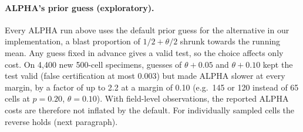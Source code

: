 \documentclass[11pt]{article}
\theoremstyle{remark}
\theoremstyle{definition}
\begin{document}
\paragraph{ALPHA's prior guess (exploratory).} Every ALPHA run above uses the default prior guess for the alternative in our implementation, a blast proportion of $1/2+\theta/2$ shrunk towards the running mean. Any guess fixed in advance gives a valid test, so the choice affects only cost. On 4,400 new 500-cell specimens, guesses of $\theta+0.05$ and $\theta+0.10$ kept the test valid (false certification at most 0.003) but made ALPHA slower at every margin, by a factor of up to 2.2 at a margin of 0.10 (e.g.\ 145 or 120 instead of 65 cells at $p=0.20$, $\theta=0.10$). With field-level observations, the reported ALPHA costs are therefore not inflated by the default. For individually sampled cells the reverse holds (next paragraph).
\end{document}
